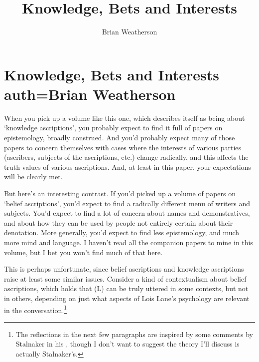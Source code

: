 \documentclass[11pt,oneside]{book}
\title{Knowledge, Bets and Interests}
\author{Brian Weatherson}
\begin{document}



\setcounter{paper}{0}

\chapter[Knowledge, Bets and Interests]{Knowledge, Bets and Interests auth=Brian Weatherson}

\renewcommand{\thefootnote}{\fnsymbol{footnote}}
\renewcommand{\thefootnote}{\arabic{footnote}} 

When you pick up a volume like this one, which describes itself as being about `knowledge ascriptions', you probably expect to find it full of papers on epistemology, broadly construed. And you'd probably expect many of those papers to concern themselves with cases where the interests of various parties (ascribers, subjects of the ascriptions, etc.) change radically, and this affects the truth values of various ascriptions. And, at least in this paper, your expectations will be clearly met.

But here's an interesting contrast. If you'd picked up a volume of papers on `belief ascriptions', you'd expect to find a radically different menu of writers and subjects. You'd expect to find a lot of concern about names and demonstratives, and about how they can be used by people not entirely certain about their denotation. More generally, you'd expect to find less epistemology, and much more mind and language. I haven't read all the companion papers to mine in this volume, but I bet you won't find much of that here.

This is perhaps unfortunate, since belief ascriptions and knowledge ascriptions raise at least some similar issues. Consider a kind of contextualism about belief ascriptions, which holds that (L) can be truly uttered in some contexts, but not in others, depending on just what aspects of Lois Lane's psychology are relevant in the conversation.\footnote{The reflections in the next few paragraphs are inspired by some comments by Stalnaker in his \citeyearpar{Stalnaker2008}, though I don't want to suggest the theory I'll discuss is actually Stalnaker's.}
\end{document}
